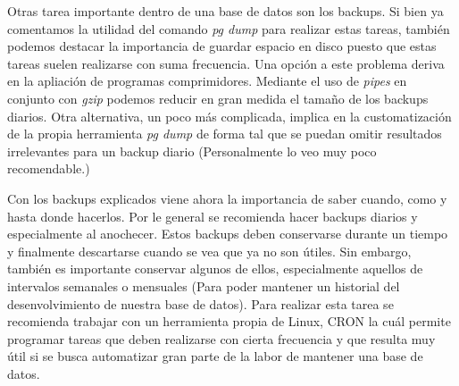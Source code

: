 \documentclass[12pt,conference]{IEEEtran}
\begin{document}
Otras tarea importante dentro de una base de datos son los backups. Si bien ya comentamos la utilidad del comando \textit{pg dump} para realizar estas tareas, también podemos destacar la importancia de guardar espacio en disco  puesto que estas tareas suelen realizarse con suma frecuencia. Una opción a este problema deriva en la apliación de programas comprimidores. Mediante el uso de \textit{pipes} en conjunto con \textit{gzip} podemos reducir en gran medida el tamaño de los backups diarios. Otra alternativa, un poco más complicada, implica en la customatización de la propia herramienta \textit{pg dump} de forma tal que se puedan omitir resultados irrelevantes para un backup diario (Personalmente lo veo muy poco recomendable.)

Con los backups explicados viene ahora la importancia de saber cuando, como y hasta donde hacerlos. Por le general se recomienda hacer backups diarios y especialmente al anochecer. Estos backups deben conservarse durante un tiempo y finalmente descartarse cuando se vea que ya no son útiles. Sin embargo, también es importante conservar algunos de ellos, especialmente aquellos de intervalos semanales o mensuales (Para poder mantener un historial del desenvolvimiento de nuestra base de datos). 
Para realizar esta tarea se recomienda trabajar con un herramienta propia de Linux, CRON la cuál permite programar tareas que deben realizarse con cierta frecuencia y que resulta muy útil si se busca automatizar gran parte de la labor de mantener una base de datos. 
\end{document}
